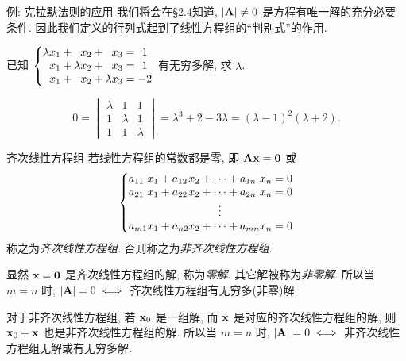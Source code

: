 \begin{frame}{例: 克拉默法则的应用}
	\onslide<+->
	我们将会在\S2.4知道, \alert{$|{\mathbf{A}}|\neq0$ 是方程有唯一解的充分必要条件}.
	\onslide<+->
	因此我们定义的行列式起到了线性方程组的``判别式''的作用.
	\onslide<+->
	\begin{example}
		已知 $\laeq[rrrc]{
			\lambda x_1+{}&x_2+{}&x_3={}&1\\
			x_1+{}&\lambda x_2+{}&x_3={}&1\\
			x_1+{}&x_2+{}&\lambda x_3={}&-2}$
		有无穷多解, 求 $\lambda$.
	\end{example}
	\onslide<+->
	\begin{solution}
		\[0=\begin{vmatrix}
			\lambda&1&1\\1&\lambda&1\\1&1&\lambda
		\end{vmatrix}
		=\lambda^3+2-3\lambda=(\lambda-1)^2(\lambda+2).\]
		\onslide<+->{%
			因此 $\lambda=-2$.
		}
	\end{solution}
\end{frame}


\begin{frame}{齐次线性方程组}
	\onslide<+->
	若线性方程组的常数都是零, 即 ${\mathbf{A}}{\mathbf{x}}={\bf0}$ 或
	\[\laeq[lclcclcl]{
		a_{11}&x_1+{}&a_{12}&x_2&{}+\cdots+{}&a_{1n}&x_n={}&0\\
		a_{21}&x_1+{}&a_{22}&x_2&{}+\cdots+{}&a_{2n}&x_n={}&0\\
		&&&&\vdots&&&\\
		a_{m1}&x_1+{}&a_{n2}&x_2&{}+\cdots+{}&a_{mn}&x_n={}&0
	}\]
	称之为\emph{齐次线性方程组}.
	\onslide<+->
	否则称之为\emph{非齐次线性方程组}.

	\onslide<+->
	显然 ${\mathbf{x}}={\bf0}$ 是齐次线性方程组的解, 称为\emph{零解}. 其它解被称为\emph{非零解}.
	\onslide<+->
	所以当 $m=n$ 时, \alert{$|{\mathbf{A}}|=0\iff$ 齐次线性方程组有无穷多(非零)解}.

	\onslide<+->
	对于非齐次线性方程组, 若 ${\mathbf{x}}_0$ 是一组解, 而 ${\mathbf{x}}$ 是对应的齐次线性方程组的解,
	\onslide<+->
	则 ${\mathbf{x}}_0+{\mathbf{x}}$ 也是非齐次线性方程组的解.
	\onslide<+->
	所以当 $m=n$ 时, \alert{$|{\mathbf{A}}|=0\iff$ 非齐次线性方程组无解或有无穷多解}.
\end{frame}


